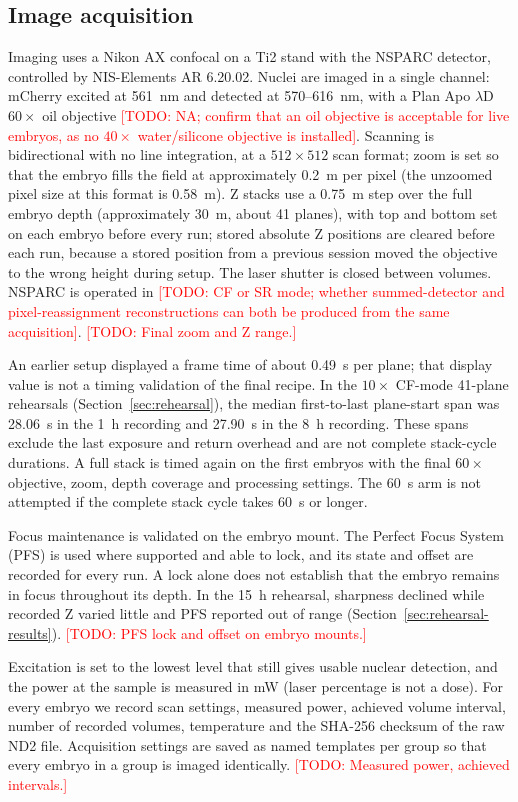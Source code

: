 \documentclass[11pt]{article}
\newcommand{\todo}[1]{\textcolor{red}{[TODO: #1]}}
\begin{document}
\subsection{Image acquisition}
Imaging uses a Nikon AX confocal on a Ti2 stand with the NSPARC detector, controlled
by NIS-Elements AR 6.20.02. Nuclei are imaged in a single channel: mCherry excited
at 561~nm and detected at 570--616~nm, with a Plan Apo $\lambda$D $60\times$ oil
objective \todo{NA; confirm that an oil objective is acceptable for live embryos,
as no $40\times$ water/silicone objective is installed}. Scanning is bidirectional
with no line integration, at a $512\times512$ scan format; zoom is set so that the
embryo fills the field at approximately 0.2~\textmu m per pixel (the
unzoomed pixel size at this format is 0.58~\textmu m). Z stacks use a 0.75~\textmu m
step over the full embryo depth (approximately 30~\textmu m, about 41 planes),
with top and bottom set on each embryo before every run; stored absolute Z
positions are cleared before each run, because a stored position from a previous
session moved the objective to the wrong height during setup. The laser shutter is
closed between volumes. NSPARC is operated in \todo{CF or SR mode; whether
summed-detector and pixel-reassignment reconstructions can both be produced from
the same acquisition}. \todo{Final zoom and Z range.}

An earlier setup displayed a frame time of about 0.49~s per plane; that display
value is not a timing validation of the final recipe. In the $10\times$ CF-mode
41-plane rehearsals (Section~\ref{sec:rehearsal}), the median first-to-last
plane-start span was 28.06~s in the 1~h recording and 27.90~s in the 8~h recording.
These spans exclude the last exposure and return overhead and are not complete
stack-cycle durations. A full stack is timed again on the first embryos with the
final $60\times$ objective, zoom, depth coverage and processing settings. The 60~s
arm is not attempted if the complete stack cycle takes 60~s or longer.

Focus maintenance is validated on the embryo mount. The Perfect Focus System
(PFS) is used where supported and able to lock, and its state and offset are
recorded for every run. A lock alone does not establish that the embryo remains
in focus throughout its depth. In the 15~h rehearsal, sharpness declined while
recorded Z varied little and PFS reported out of range
(Section~\ref{sec:rehearsal-results}). \todo{PFS lock and offset on embryo mounts.}

Excitation is set to the lowest level that still gives usable nuclear detection,
and the power at the sample is measured in mW (laser percentage is not a dose).
For every embryo we record scan settings, measured power, achieved volume interval,
number of recorded volumes, temperature and the SHA-256 checksum of the raw ND2
file. Acquisition settings are saved as named templates per group so that every
embryo in a group is imaged identically. \todo{Measured power, achieved intervals.}
\end{document}
